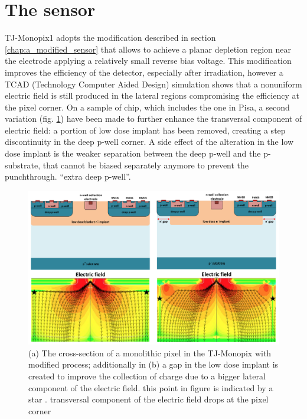 \section{The sensor}
    TJ-Monopix1 adopts the modification described in section \ref{chap:a_modified_sensor} that allows to achieve a planar depletion region near the electrode applying a relatively small reverse bias voltage.
    This modification improves the efficiency of the detector, especially after irradiation, however a TCAD (Technology Computer Aided Design) simulation shows that a nonuniform electric field is still produced in the lateral regions compromising the efficiency at the pixel corner.
    On a sample of chip, which includes the one in Pisa, a second variation (fig. \ref{fig:Monopix1_section_scheme}) have been made to further enhance the transversal component of electric field: a portion of low dose implant has been removed, creating a step discontinuity in the deep p-well corner. 
    A side effect of the alteration in the low dose implant is the weaker separation between the deep p-well and the p-substrate, that cannot be biased separately anymore to prevent the punchthrough. 
    “extra deep p-well”.
        \begin{figure}[h!]
        \centering
        \includegraphics[width=.9\linewidth]{figures/Monopix1/Monopix1_section_scheme.png}
        \caption{(a) The cross-section of a monolithic pixel in the TJ-Monopix with modified process; additionally in (b) a gap in the low dose implant is created to improve the collection of charge due to a bigger lateral component of the electric field. this point in figure  is indicated by a star . transversal component of the electric field drops at the pixel corner}
        \label{fig:Monopix1_section_scheme}
    \end{figure}


